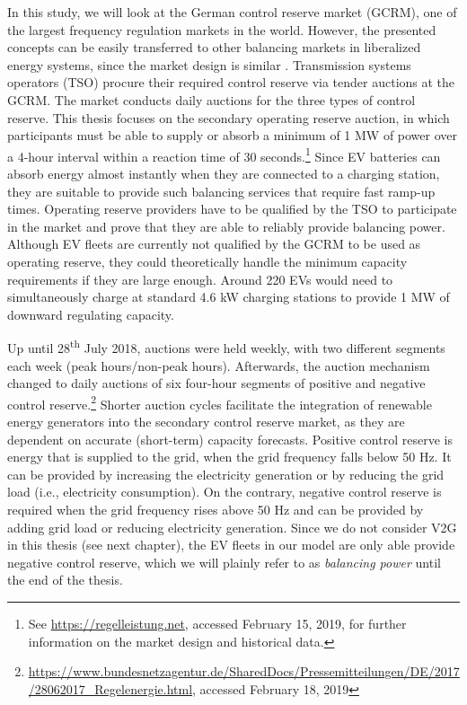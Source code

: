\documentclass[a4paper, 12pt]{article}
\let\cite\shortcite
\begin{document}
In this study, we will look at the German control reserve market (GCRM), one of
the largest frequency regulation markets in the world. However, the presented
concepts can be easily transferred to other balancing markets in liberalized
energy systems, since the market design is similar
\cite{brandt17_evaluat_busin_model_vehic_grid_integ}. Transmission systems
operators (TSO) procure their required control reserve via tender auctions at
the GCRM. The market conducts daily auctions for the three types of control
reserve. This thesis focuses on the secondary operating reserve auction, in
which participants must be able to supply or absorb a minimum of 1 MW of power
over a 4-hour interval within a reaction time of 30 seconds.\footnote{See \url{https://regelleistung.net}, accessed February 15,
2019, for further information on the market design and historical data.} Since EV
batteries can absorb energy almost instantly when they are connected to a
charging station, they are suitable to provide such balancing services that
require fast ramp-up times. Operating reserve providers have to be qualified by
the TSO to participate in the market and prove that they are able to reliably
provide balancing power. Although EV fleets are currently not qualified by the
GCRM to be used as operating reserve, they could theoretically handle the
minimum capacity requirements if they are large enough. Around 220 EVs would
need to simultaneously charge at standard 4.6 kW charging stations to provide 1
MW of downward regulating capacity.

Up until 28\textsuperscript{th} July 2018, auctions were held weekly, with two different
segments each week (peak hours/non-peak hours). Afterwards, the auction
mechanism changed to daily auctions of six four-hour segments of positive and
negative control reserve.\footnote{\url{https://www.bundesnetzagentur.de/SharedDocs/Pressemitteilungen/DE/2017/28062017\_Regelenergie.html},
accessed February 18, 2019} Shorter auction cycles facilitate the
integration of renewable energy generators into the secondary control reserve
market, as they are dependent on accurate (short-term) capacity forecasts.
Positive control reserve is energy that is supplied to the grid, when the grid
frequency falls below 50 Hz. It can be provided by increasing the electricity
generation or by reducing the grid load (i.e., electricity consumption). On the
contrary, negative control reserve is required when the grid frequency rises
above 50 Hz and can be provided by adding grid load or reducing electricity
generation. Since we do not consider V2G in this thesis (see next chapter), the
EV fleets in our model are only able provide negative control reserve, which
we will plainly refer to as \emph{balancing power} until the end of the thesis.
\end{document}
